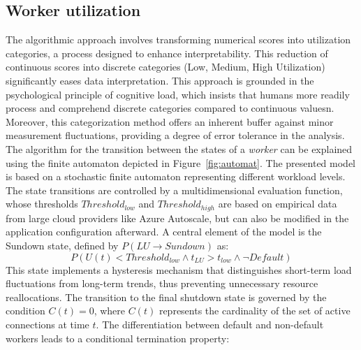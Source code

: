\documentclass[twocolumn]{webofc}
\begin{document}
\subsection{Worker utilization}
The algorithmic approach involves transforming numerical scores into utilization categories, a process designed to enhance interpretability. This reduction of continuous scores into discrete categories (Low, Medium, High Utilization) significantly eases data interpretation. This approach is grounded in the psychological principle of cognitive load, which insists that humans more readily process and comprehend discrete categories compared to continuous valuesn\cite{cogload}. Moreover, this categorization method offers an inherent buffer against minor measurement fluctuations, providing a degree of error tolerance in the analysis. The algorithm for the transition between the states of a \textit{worker} can be explained using the finite automaton depicted in Figure~\ref{fig:automat}. The presented model is based on a stochastic finite automaton representing different workload levels. The state transitions are controlled by a multidimensional evaluation function, whose thresholds $Threshold_{low}$ and $Threshold_{high}$ are based on empirical data from large cloud providers like Azure Autoscale\cite{azure_autoscale_best_practices}, but can also be modified in the application configuration afterward. A central element of the model is the Sundown state, defined by \( P(LU \rightarrow Sundown) \) as:
$$P(U(t) < Threshold_{low} \wedge t_{LU} > t_{low} \wedge \neg Default) $$
This state implements a hysteresis mechanism that distinguishes short-term load fluctuations from long-term trends, thus preventing unnecessary resource reallocations. The transition to the final shutdown state is governed by the condition $C(t) = 0$, where $C(t)$ represents the cardinality of the set of active connections at time $t$. The differentiation between default and non-default workers leads to a conditional termination property:
\end{document}
